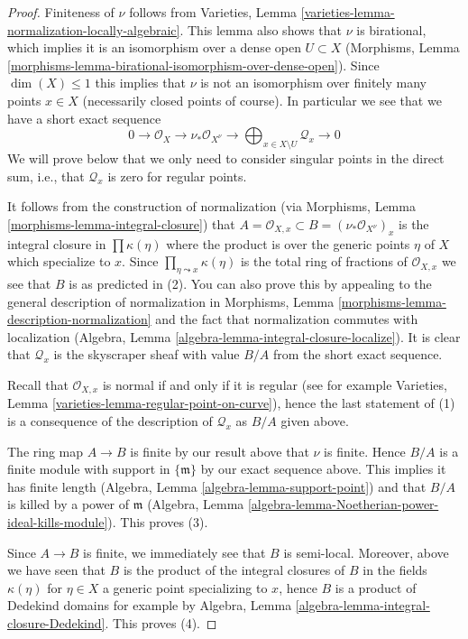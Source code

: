 \begin{proof}
Finiteness of $\nu$ follows from
Varieties, Lemma \ref{varieties-lemma-normalization-locally-algebraic}.
This lemma also shows that $\nu$ is birational, which implies
it is an isomorphism over a dense open $U \subset X$
(Morphisms, Lemma \ref{morphisms-lemma-birational-isomorphism-over-dense-open}).
Since $\dim(X) \leq 1$ this implies that $\nu$ is not an isomorphism
over finitely many points $x \in X$ (necessarily closed points of course).
In particular we see that we have a short exact sequence
$$
0 \to \mathcal{O}_X \to \nu_*\mathcal{O}_{X^\nu} \to
\bigoplus\nolimits_{x \in X \setminus U} \mathcal{Q}_x \to 0
$$
We will prove below that we only need to consider singular points
in the direct sum, i.e., that $\mathcal{Q}_x$ is zero for regular points.

\medskip\noindent
It follows from the construction of normalization
(via Morphisms, Lemma \ref{morphisms-lemma-integral-closure})
that $A = \mathcal{O}_{X, x} \subset B = (\nu_*\mathcal{O}_{X^\nu})_x$ is
the integral closure in $\prod \kappa(\eta)$ where the product is
over the generic points $\eta$ of $X$ which specialize to $x$.
Since $\prod_{\eta \leadsto x} \kappa(\eta)$ is the
total ring of fractions of $\mathcal{O}_{X, x}$ we see that $B$ is as
predicted in (2). You can also prove this by appealing to the
general description of normalization in Morphisms, Lemma
\ref{morphisms-lemma-description-normalization}
and the fact that normalization commutes with localization
(Algebra, Lemma \ref{algebra-lemma-integral-closure-localize}).
It is clear that $\mathcal{Q}_x$ is the skyscraper sheaf with
value $B/A$ from the short exact sequence.

\medskip\noindent
Recall that $\mathcal{O}_{X, x}$ is normal if and only if it is
regular (see for example
Varieties, Lemma \ref{varieties-lemma-regular-point-on-curve}),
hence the last statement of (1) is a consequence of the
description of $\mathcal{Q}_x$ as $B/A$ given above.

\medskip\noindent
The ring map $A \to B$ is finite by our result above that $\nu$ is finite.
Hence $B/A$ is a finite module with support in
$\{\mathfrak m\}$ by our exact sequence above.
This implies it has finite length
(Algebra, Lemma \ref{algebra-lemma-support-point}) and
that $B/A$ is killed by a power of $\mathfrak m$
(Algebra, Lemma \ref{algebra-lemma-Noetherian-power-ideal-kills-module}).
This proves (3).

\medskip\noindent
Since $A \to B$ is finite, we immediately see that $B$ is semi-local.
Moreover, above we have seen that
$B$ is the product of the integral closures of $B$
in the fields $\kappa(\eta)$ for $\eta \in X$ a generic point
specializing to $x$, hence $B$ is a product of Dedekind domains
for example by Algebra, Lemma \ref{algebra-lemma-integral-closure-Dedekind}.
This proves (4).


\end{proof}
